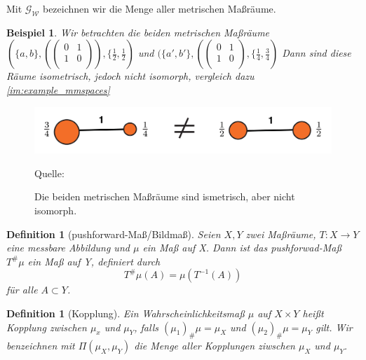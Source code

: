 \documentclass[11pt,a4paper]{article}
\newcommand{\source}[1]{\caption*{\hfill Quelle: {#1}} }
\newtheorem{definition}[theorem]{Definition}
\newtheorem{example}[theorem]{Beispiel}
\numberwithin{equation}{section}
\begin{document}
Mit $\mathcal{G}_\mathcal{W}$ bezeichnen wir die Menge aller metrischen Maßräume.

\begin{example}
	Wir betrachten die beiden metrischen Maßräume $(\lbrace a,b \rbrace, (\begin{pmatrix}
	0 & 1\\
	1 & 0 \\
	\end{pmatrix}), \lbrace \frac{1}{2},\frac{1}{2})$ und 
		$(\lbrace a',b' \rbrace, (
	\begin{pmatrix}
		0 & 1\\
		1 & 0 \\
	\end{pmatrix}, \lbrace \frac{1}{4},\frac{3}{4})$
	Dann sind diese Räume isometrisch, jedoch nicht isomorph, vergleich dazu \autoref{im:example_mmspaces}
\end{example}

\begin{figure}[ht]
	\centering
	\includegraphics[width=0.3\textheight]{example_mmspaces.png}
	\caption[Beispiel isometrischer metrischer Maßräume]{Die beiden metrischen Maßräume sind ismetrisch, aber nicht isomorph.}
	\source{\cite{COTcuturi}}
	\label{im:example_mmspaces}
\end{figure}

\begin{definition}[pushforward-Maß/Bildmaß]
	Seien $X,Y$ zwei Maßräume, $T: X \to Y$ eine messbare Abbildung und $\mu$ ein Maß auf X. Dann ist das pushforwad-Maß $T^\# \mu $ ein Maß auf Y, definiert durch \begin{equation}
	T^\# \mu (A) = \mu (T^{-1}(A))
	\end{equation}
	für alle $A \subset Y$.
\end{definition}
\begin{definition}[Kopplung]
	Ein Wahrscheinlichkeitsmaß $\mu$ auf $X \times Y$ heißt Kopplung zwischen $\mu_x$ und $\mu_Y$, falls $(\mu_1)_\#\mu = \mu_X$ und $(\mu_2)_\#\mu = \mu_Y$ gilt. Wir benzeichnen mit $\Pi(\mu_X,\mu_Y)$ die Menge aller Kopplungen ziwschen $\mu_X$ und $\mu_Y$.
\end{definition}
	
\end{document}
